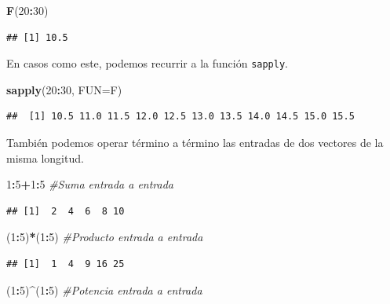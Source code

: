 \documentclass[]{book}
\newenvironment{Shaded}{\begin{snugshade}}{\end{snugshade}}
\newcommand{\CommentTok}[1]{\textcolor[rgb]{0.56,0.35,0.01}{\textit{#1}}}
\newcommand{\DataTypeTok}[1]{\textcolor[rgb]{0.13,0.29,0.53}{#1}}
\newcommand{\DecValTok}[1]{\textcolor[rgb]{0.00,0.00,0.81}{#1}}
\newcommand{\KeywordTok}[1]{\textcolor[rgb]{0.13,0.29,0.53}{\textbf{#1}}}
\newcommand{\NormalTok}[1]{#1}
\newcommand{\OperatorTok}[1]{\textcolor[rgb]{0.81,0.36,0.00}{\textbf{#1}}}
\theoremstyle{definition}
\theoremstyle{definition}
\theoremstyle{definition}
\theoremstyle{remark}
\begin{document}
\begin{Shaded}
\begin{Highlighting}[]
\KeywordTok{F}\NormalTok{(}\DecValTok{20}\OperatorTok{:}\DecValTok{30}\NormalTok{)}
\end{Highlighting}
\end{Shaded}

\begin{verbatim}
## [1] 10.5
\end{verbatim}

En casos como este, podemos recurrir a la función \texttt{sapply}.

\begin{Shaded}
\begin{Highlighting}[]
\KeywordTok{sapply}\NormalTok{(}\DecValTok{20}\OperatorTok{:}\DecValTok{30}\NormalTok{, }\DataTypeTok{FUN=}\NormalTok{F)}
\end{Highlighting}
\end{Shaded}

\begin{verbatim}
##  [1] 10.5 11.0 11.5 12.0 12.5 13.0 13.5 14.0 14.5 15.0 15.5
\end{verbatim}

También podemos operar término a término las entradas de dos vectores de la misma longitud.

\begin{Shaded}
\begin{Highlighting}[]
\DecValTok{1}\OperatorTok{:}\DecValTok{5}\OperatorTok{+}\DecValTok{1}\OperatorTok{:}\DecValTok{5} \CommentTok{#Suma entrada a entrada}
\end{Highlighting}
\end{Shaded}

\begin{verbatim}
## [1]  2  4  6  8 10
\end{verbatim}

\begin{Shaded}
\begin{Highlighting}[]
\NormalTok{(}\DecValTok{1}\OperatorTok{:}\DecValTok{5}\NormalTok{)}\OperatorTok{*}\NormalTok{(}\DecValTok{1}\OperatorTok{:}\DecValTok{5}\NormalTok{) }\CommentTok{#Producto entrada a entrada}
\end{Highlighting}
\end{Shaded}

\begin{verbatim}
## [1]  1  4  9 16 25
\end{verbatim}

\begin{Shaded}
\begin{Highlighting}[]
\NormalTok{(}\DecValTok{1}\OperatorTok{:}\DecValTok{5}\NormalTok{)}\OperatorTok{^}\NormalTok{(}\DecValTok{1}\OperatorTok{:}\DecValTok{5}\NormalTok{) }\CommentTok{#Potencia entrada a entrada}
\end{Highlighting}
\end{Shaded}
\end{document}
